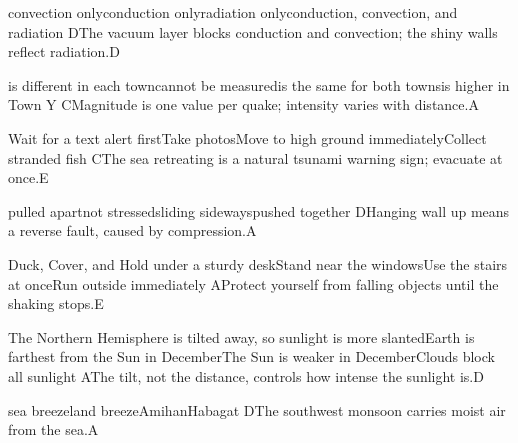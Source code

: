 \begin{gradebody}
{convection only}{conduction only}{radiation only}{conduction, convection, and radiation}
{D}{The vacuum layer blocks conduction and convection; the shiny walls reflect radiation.}{D}

{is different in each town}{cannot be measured}{is the same for both towns}{is higher in Town Y}
{C}{Magnitude is one value per quake; intensity varies with distance.}{A}

{Wait for a text alert first}{Take photos}{Move to high ground immediately}{Collect stranded fish}
{C}{The sea retreating is a natural tsunami warning sign; evacuate at once.}{E}

{pulled apart}{not stressed}{sliding sideways}{pushed together}
{D}{Hanging wall up means a reverse fault, caused by compression.}{A}

{Duck, Cover, and Hold under a sturdy desk}{Stand near the windows}{Use the stairs at once}{Run outside immediately}
{A}{Protect yourself from falling objects until the shaking stops.}{E}

{The Northern Hemisphere is tilted away, so sunlight is more slanted}{Earth is farthest from the Sun in December}{The Sun is weaker in December}{Clouds block all sunlight}
{A}{The tilt, not the distance, controls how intense the sunlight is.}{D}

{sea breeze}{land breeze}{Amihan}{Habagat}
{D}{The southwest monsoon carries moist air from the sea.}{A}

\end{gradebody}
\probstats
